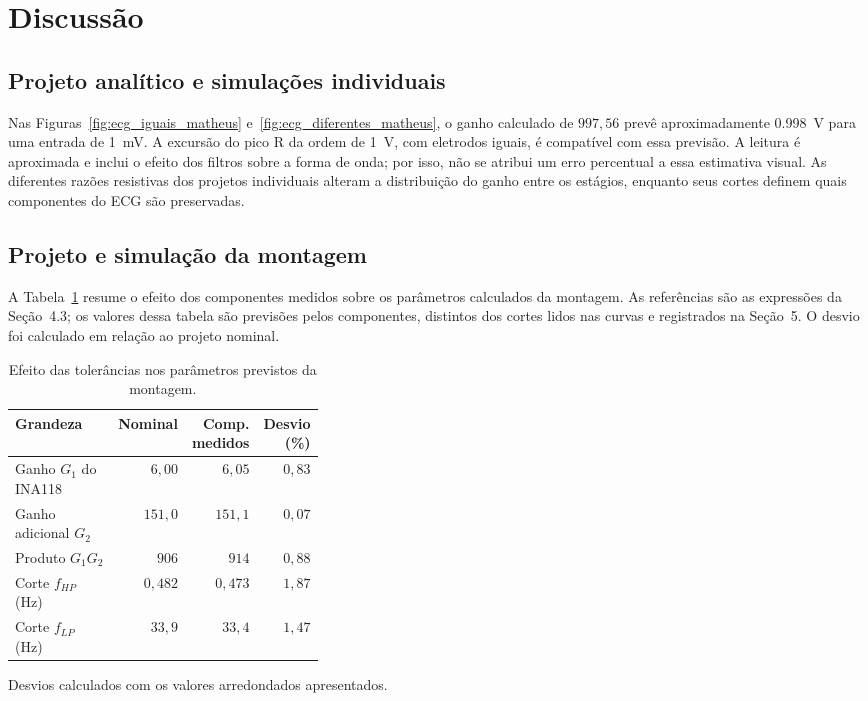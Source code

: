 \documentclass[11pt,a4paper]{article}
\begin{document}
\section{Discussão}

\subsection{Projeto analítico e simulações individuais}

Nas Figuras~\ref{fig:ecg_iguais_matheus} e~\ref{fig:ecg_diferentes_matheus}, o ganho calculado de $997,56$ prevê aproximadamente \SI{0,998}{\volt} para uma entrada de \SI{1}{\milli\volt}. A excursão do pico R da ordem de \SI{1}{\volt}, com eletrodos iguais, é compatível com essa previsão. A leitura é aproximada e inclui o efeito dos filtros sobre a forma de onda; por isso, não se atribui um erro percentual a essa estimativa visual. As diferentes razões resistivas dos projetos individuais alteram a distribuição do ganho entre os estágios, enquanto seus cortes definem quais componentes do ECG são preservadas.

\subsection{Projeto e simulação da montagem}

A Tabela~\ref{tab:discussao_tolerancias_r4} resume o efeito dos componentes medidos sobre os parâmetros calculados da montagem. As referências são as expressões da Seção~4.3; os valores dessa tabela são previsões pelos componentes, distintos dos cortes lidos nas curvas e registrados na Seção~5. O desvio foi calculado em relação ao projeto nominal.

\begin{table}[H]
\centering
\caption{Efeito das tolerâncias nos parâmetros previstos da montagem.}
\label{tab:discussao_tolerancias_r4}
\begingroup
\small
\setlength{\tabcolsep}{5pt}
\begin{tabular}{@{}p{0.36\linewidth}rrr@{}}
\toprule
\textbf{Grandeza} & \textbf{Nominal} & \textbf{Comp. medidos} & \textbf{Desvio (\%)} \\
\midrule
Ganho $G_1$ do INA118 & $6,00$ & $6,05$ & $0,83$ \\
Ganho adicional $G_2$ & $151,0$ & $151,1$ & $0,07$ \\
Produto $G_1G_2$ & $906$ & $914$ & $0,88$ \\
Corte $f_{HP}$ (Hz) & $0,482$ & $0,473$ & $1,87$ \\
Corte $f_{LP}$ (Hz) & $33,9$ & $33,4$ & $1,47$ \\
\bottomrule
\end{tabular}
\par\smallskip
{\footnotesize Desvios calculados com os valores arredondados apresentados.}
\endgroup
\end{table}
\end{document}
